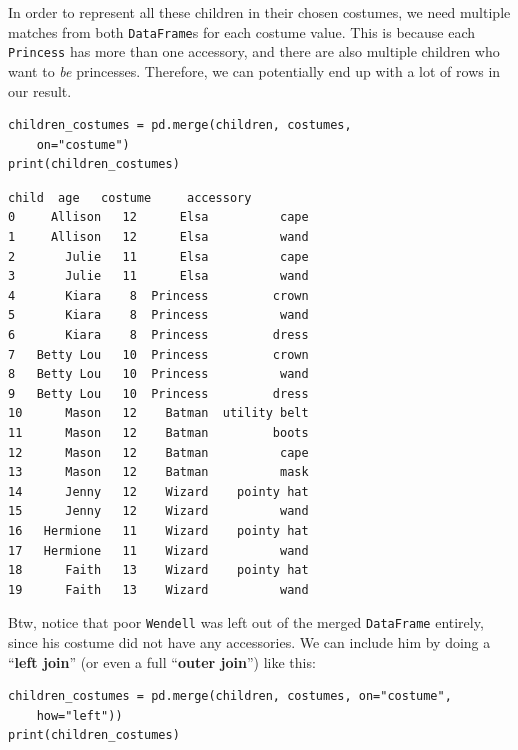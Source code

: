 \bigskip
In order to represent all these children in their chosen costumes, we need
multiple matches from both \texttt{DataFrame}s for each costume value. This is
because each \texttt{Princess} has more than one accessory, and there are also
multiple children who want to \textit{be} princesses. Therefore, we can
potentially end up with a lot of rows in our result.

\begin{Verbatim}[fontsize=\small,samepage=true,frame=single,framesep=3mm]
children_costumes = pd.merge(children, costumes,
    on="costume")
print(children_costumes)
\end{Verbatim}
\vspace{-.2in}

\begin{Verbatim}[fontsize=\small,samepage=true,frame=leftline,framesep=5mm,framerule=1mm]
        child  age   costume     accessory
0     Allison   12      Elsa          cape
1     Allison   12      Elsa          wand
2       Julie   11      Elsa          cape
3       Julie   11      Elsa          wand
4       Kiara    8  Princess         crown
5       Kiara    8  Princess          wand
6       Kiara    8  Princess         dress
7   Betty Lou   10  Princess         crown
8   Betty Lou   10  Princess          wand
9   Betty Lou   10  Princess         dress
10      Mason   12    Batman  utility belt
11      Mason   12    Batman         boots
12      Mason   12    Batman          cape
13      Mason   12    Batman          mask
14      Jenny   12    Wizard    pointy hat
15      Jenny   12    Wizard          wand
16   Hermione   11    Wizard    pointy hat
17   Hermione   11    Wizard          wand
18      Faith   13    Wizard    pointy hat
19      Faith   13    Wizard          wand
\end{Verbatim}


Btw, notice that poor \texttt{Wendell} was left out of the merged
\texttt{DataFrame} entirely, since his costume did not have any accessories. We
can include him by doing a ``\textbf{left join}'' (or even a full
``\textbf{outer join}'') like this:


\begin{Verbatim}[fontsize=\footnotesize,samepage=true,frame=single,framesep=3mm]
children_costumes = pd.merge(children, costumes, on="costume",
    how="left"))
print(children_costumes)
\end{Verbatim}


